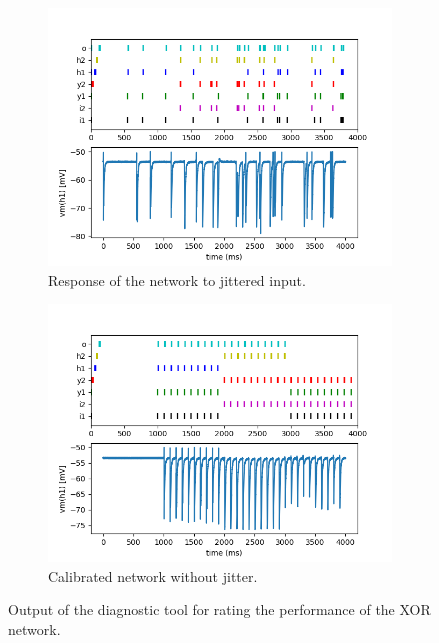 \documentclass[10pt,a4paper]{article}
\begin{document}
\begin{figure}
    \centering
    \begin{subfigure}[t]{\textwidth}
        \includegraphics[width=\textwidth]{figures/XOR-output.png}
        \caption{Response of the network to jittered input.}
    \end{subfigure}
    \begin{subfigure}[t]{\textwidth}
        \includegraphics[width=\textwidth]{figures/XOR-succesful.png}
        \caption{Calibrated network without jitter.}
    \end{subfigure}
    \caption{Output of the diagnostic tool for rating the performance of the XOR network.}
    \label{fig:XOR-output}
\end{figure}
\end{document}

